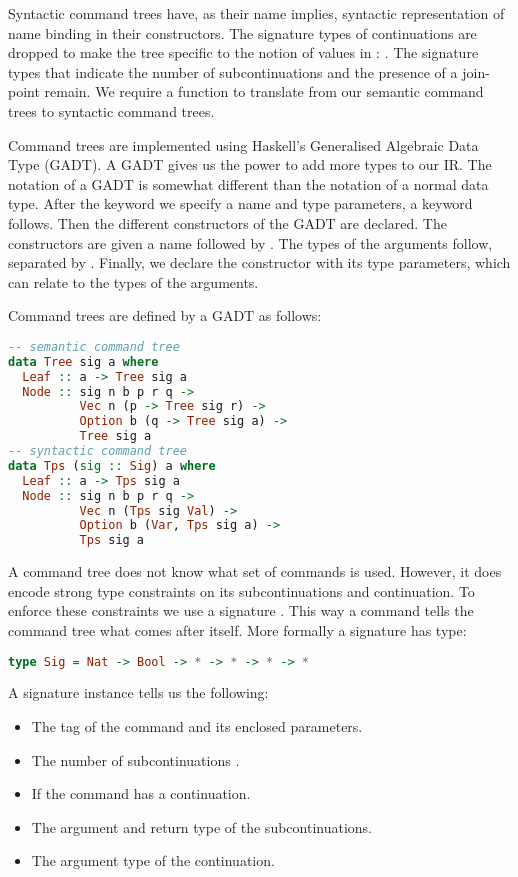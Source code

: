 Syntactic command trees have, as their name implies, syntactic representation of name binding in their constructors. The signature types of continuations are dropped to make the tree specific to the notion of values in : . The signature types that indicate the number of subcontinuations and the presence of a join-point remain. We require a function to translate from our semantic command trees to syntactic command trees.

Command trees are implemented using Haskell's Generalised Algebraic Data Type (GADT). A GADT gives us the power to add more types to our IR. The notation of a GADT is somewhat different than the notation of a normal data type. After the  keyword we specify a name and type parameters, a  keyword follows. Then the different constructors of the GADT are declared. The constructors are given a name followed by \icode{::}. The types of the arguments follow, separated by \icode{->}. Finally, we declare the constructor with its type parameters, which can relate to the types of the arguments.

Command trees are defined by a GADT as follows:

\begin{lstlisting}[language=Haskell]
-- semantic command tree
data Tree sig a where
  Leaf :: a -> Tree sig a
  Node :: sig n b p r q ->
          Vec n (p -> Tree sig r) ->
          Option b (q -> Tree sig a) ->
          Tree sig a
-- syntactic command tree
data Tps (sig :: Sig) a where
  Leaf :: a -> Tps sig a
  Node :: sig n b p r q ->
          Vec n (Tps sig Val) ->
          Option b (Var, Tps sig a) ->
          Tps sig a
\end{lstlisting}

A command tree does not know what set of commands is used. However, it does encode strong type constraints on its subcontinuations and continuation. To enforce these constraints we use a signature . This way a command tells the command tree what comes after itself. More formally a signature has type:

\begin{lstlisting}[language=Haskell]
type Sig = Nat -> Bool -> * -> * -> * -> *
\end{lstlisting}

A signature instance  tells us the following:

\begin{itemize}
\item The tag of the command and its enclosed parameters.
\item The number of subcontinuations .
\item If the command has a continuation.
\item The argument  and return type  of the subcontinuations.
\item The argument type  of the continuation.
\end{itemize}

